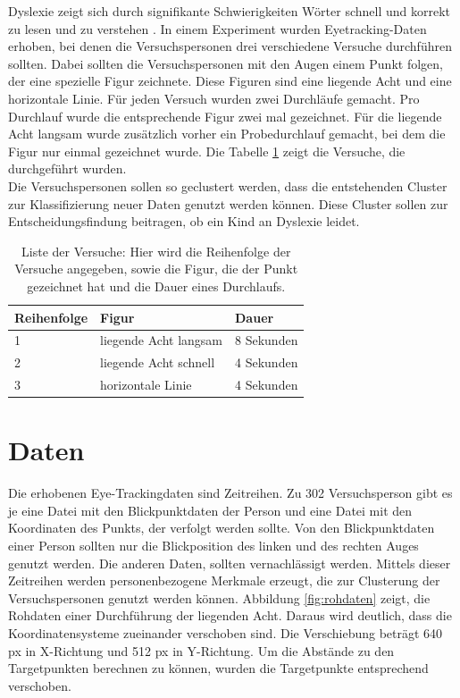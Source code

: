 \documentclass[12pt]{article}
\begin{document}
Dyslexie zeigt sich durch signiﬁkante Schwierigkeiten W\"orter schnell und korrekt zu lesen und zu verstehen \cite{Handlere818, Siegel2006}.
In einem Experiment wurden Eyetracking-Daten erhoben, bei denen die Versuchspersonen drei verschiedene Versuche durchf\"uhren sollten. Dabei sollten die Versuchspersonen mit den Augen einem Punkt folgen, der eine spezielle Figur zeichnete. Diese Figuren sind eine liegende Acht und eine horizontale Linie. F\"ur jeden Versuch wurden zwei Durchl\"aufe gemacht. Pro Durchlauf wurde die entsprechende Figur zwei mal gezeichnet. F\"ur die liegende Acht langsam wurde zus\"atzlich vorher ein Probedurchlauf gemacht, bei dem die Figur nur einmal gezeichnet wurde.
Die Tabelle \ref{tab:Versuche} zeigt die Versuche, die durchgef\"uhrt wurden.\\
Die Versuchspersonen sollen so geclustert werden, dass die entstehenden Cluster zur Klassiﬁzierung neuer Daten genutzt werden k\"onnen. Diese Cluster sollen zur Entscheidungsfindung beitragen, ob ein Kind an Dyslexie leidet.

\begin{table}[h]
	\caption{\label{tab:Versuche}Liste der Versuche: Hier wird die Reihenfolge der Versuche angegeben, sowie die Figur, die der Punkt ge\-zeich\-net hat und die Dauer eines Durchlaufs.}
	\noindent \centering{}
	\bgroup
	\def\arraystretch{2}  %
	\begin{tabular}{|l|l|l|}
		\hline
		\textbf{Reihenfolge} & \textbf{Figur} & \textbf{Dauer}\\
		\hline \hline
		1 & liegende Acht langsam & 8 Sekunden\\
		\hline
		2 & liegende Acht schnell & 4 Sekunden\\
		\hline
		3 & horizontale Linie & 4 Sekunden\\
		\hline
	\end{tabular}
	\egroup
\end{table}

\section*{Daten}
Die erhobenen Eye-Trackingdaten sind Zeitreihen. Zu 302 Versuchsperson gibt es je eine Datei mit den Blickpunktdaten der Person und eine Datei mit den Koordinaten des Punkts, der verfolgt werden sollte. Von den Blickpunktdaten einer Person sollten nur die Blickposition des linken und des rechten Auges genutzt werden. Die anderen Daten, sollten vernachl\"assigt werden.
Mittels dieser Zeitreihen werden personenbezogene Merkmale erzeugt, die zur Clusterung der Versuchspersonen genutzt werden k\"onnen.
Abbildung \ref{fig:rohdaten} zeigt, die Rohdaten einer Durchf\"uhrung der liegenden Acht. Daraus wird deutlich, dass die Koordinatensysteme zueinander verschoben sind. Die Verschiebung betr\"agt 640 px in X-Richtung und 512 px in Y-Richtung. Um die Abst\"ande zu den Targetpunkten berechnen zu k\"onnen, wurden die Targetpunkte entsprechend verschoben.
\end{document}
